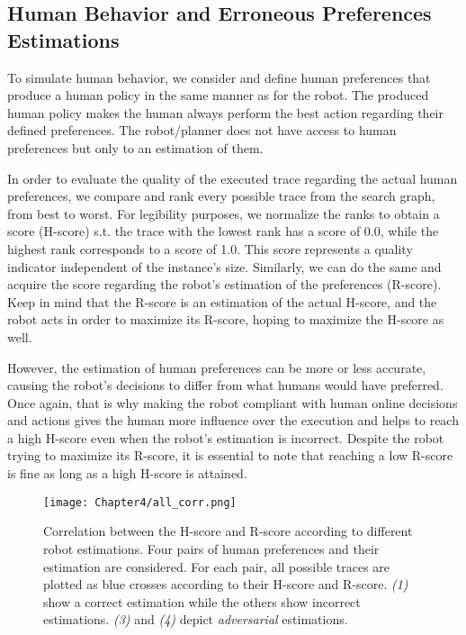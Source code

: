     \subsection*{Human Behavior and Erroneous Preferences Estimations}

To simulate human behavior, we consider and define human preferences that produce a human policy in the same manner as for the robot. The produced human policy makes the human always perform the best action regarding their defined preferences. The robot/planner does not have access to human preferences but only to an estimation of them.

In order to evaluate the quality of the executed trace regarding the actual human preferences, we compare and rank every possible trace from the search graph, from best to worst. For legibility purposes, we normalize the ranks to obtain a score (H-score) s.t. the trace with the lowest rank has a score of 0.0, while the highest rank corresponds to a score of 1.0. This score represents a quality indicator independent of the instance's size. 
Similarly, we can do the same and acquire the score regarding the robot's estimation of the preferences (R-score). 
Keep in mind that the R-score is an estimation of the actual H-score, and the robot acts in order to maximize its R-score, hoping to maximize the H-score as well.

However, the estimation of human preferences can be more or less accurate, causing the robot's decisions to differ from what humans would have preferred. Once again, that is why making the robot compliant with human online decisions and actions gives the human more influence over the execution and helps to reach a high H-score even when the robot's estimation is incorrect.
Despite the robot trying to maximize its R-score, it is essential to note that reaching a low R-score is fine as long as a high H-score is attained.

\begin{figure}
    \texttt{[image: Chapter4/all\_corr.png]}
    \caption{
    Correlation between the H-score and R-score according to different robot estimations. Four pairs of human preferences and their estimation are considered. For each pair, all possible traces are plotted as blue crosses according to their H-score and R-score. \textit{(1)} show a correct estimation while the others show incorrect estimations. \textit{(3)} and \textit{(4)} depict \textit{adversarial} estimations.
    }
    \label{fig:corr}
\end{figure}


